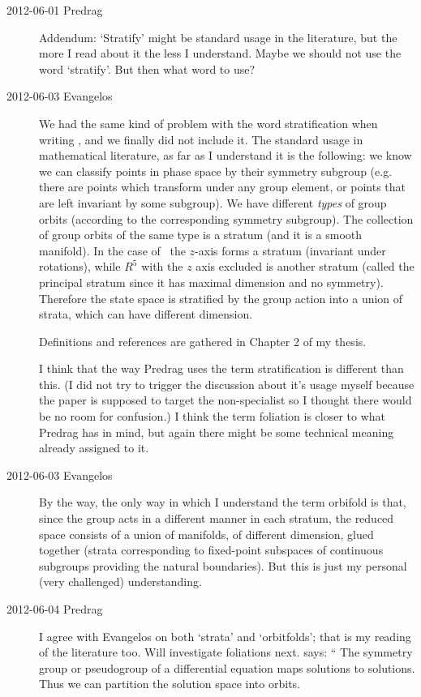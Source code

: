 \begin{description}
\item[2012-06-01 Predrag] Addendum:
`Stratify' might be standard usage in the literature, but the more I read
about it the less I understand. Maybe we should not use the word `stratify'.
But then what word to use?

\item[2012-06-03 Evangelos] We had the same kind of problem with the word
stratification when writing , and we finally did not include it.
The standard usage in mathematical
literature, as far as I understand it is the following: we know we can classify
points in phase space by their symmetry subgroup (e.g. there are points which
transform under any group element, or points that are left invariant by some
subgroup). We have different \emph{types} of group orbits (according to
the corresponding symmetry subgroup). The collection of group orbits of the
same type is a stratum (and it is a smooth manifold).
In the case of \cLe\ the $z$-axis forms a stratum
(invariant under rotations), while $R^5$ with the $z$ axis excluded is
another stratum (called the principal stratum since it has maximal dimension and
no symmetry). Therefore the state space is stratified by the group action into
a union of strata, which can have different dimension.

Definitions and references are gathered in Chapter 2 of my thesis.

I think that the way Predrag uses the term stratification is different than this.
(I did not try to trigger the discussion about it's usage myself because
the paper is supposed to target the non-specialist so I thought there would be
no room for confusion.)
I think the term foliation is closer to what Predrag has in mind, but again there
might be some technical meaning already assigned to it.


\item[2012-06-03 Evangelos] By the way, the only way in which
I understand the term orbifold is that, since
the group acts in a different manner in each stratum, the reduced space consists
of a union of manifolds, of different dimension, glued together (strata
corresponding to fixed-point subspaces of continuous subgroups providing the
natural boundaries). But this is just my personal (very challenged) understanding.

\item[2012-06-04 Predrag] I agree with Evangelos on both `strata' and `orbitfolds';
that is my reading of the  literature too. Will investigate foliations next.
 says: ``
The symmetry group or pseudogroup of a differential equation
maps solutions to solutions. Thus we can partition the solution
space into orbits.


\end{description}
